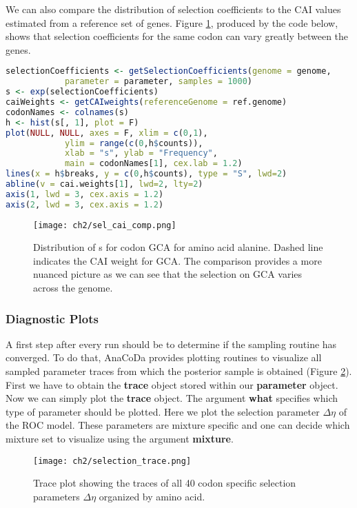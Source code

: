 We can also compare the distribution of selection coefficients to the CAI values estimated from a reference set of
genes.
Figure \ref{fig:sel_cai_comp}, produced by the code below, shows that selection coefficients for the same codon can vary greatly between the genes.

\begin{lstlisting}[language=R]
selectionCoefficients <- getSelectionCoefficients(genome = genome,
			parameter = parameter, samples = 1000)
s <- exp(selectionCoefficients)
caiWeights <- getCAIweights(referenceGenome = ref.genome)
codonNames <- colnames(s)
h <- hist(s[, 1], plot = F)
plot(NULL, NULL, axes = F, xlim = c(0,1), 
			ylim = range(c(0,h$counts)),
			xlab = "s", ylab = "Frequency", 
			main = codonNames[1], cex.lab = 1.2)
lines(x = h$breaks, y = c(0,h$counts), type = "S", lwd=2)
abline(v = cai.weights[1], lwd=2, lty=2)
axis(1, lwd = 3, cex.axis = 1.2)
axis(2, lwd = 3, cex.axis = 1.2)
\end{lstlisting}

\begin{figure}
  \centering
  \texttt{[image: ch2/sel\_cai\_comp.png]}\\
  \caption{Distribution of s for codon GCA for amino acid alanine. Dashed line indicates the CAI weight for
GCA. The comparison provides a more nuanced picture as we can see that the selection on GCA varies
across the genome.}
  \label{fig:sel_cai_comp}
\end{figure} 

\subsubsection{Diagnostic Plots}
A first step after every run should be to determine if the sampling routine has converged. 
To do that, AnaCoDa provides plotting routines to visualize all sampled parameter traces from which the posterior sample is obtained (Figure \ref{fig:selection_trace}).
First we have to obtain the \textbf{trace} object stored within our \textbf{parameter} object. 
Now we can simply plot the \textbf{trace} object. The argument \textbf{what} specifies which type of parameter should be plotted.
Here we plot the selection parameter $\Delta \eta$ of the ROC model. 
These parameters are mixture specific and one can decide which mixture set to visualize using the argument \textbf{mixture}.

\begin{figure}
  \centering
  \texttt{[image: ch2/selection\_trace.png]}\\
  \caption{Trace plot showing the traces of all 40 codon specific selection parameters $\Delta \eta$ organized by amino acid.}
  \label{fig:selection_trace}
\end{figure} 

